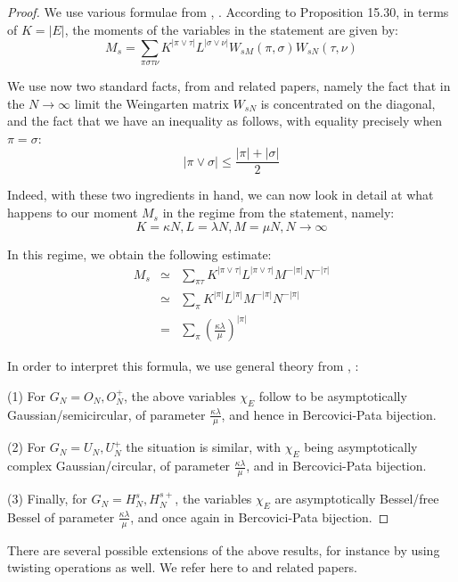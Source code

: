 \documentclass[12pt]{amsbook}
\begin{document}
\begin{proof}
We use various formulae from \cite{bbc}, \cite{bsp}. According to Proposition 15.30, in terms of $K=|E|$, the moments of the variables in the statement are given by:
$$M_s=\sum_{\pi\sigma\tau\nu}K^{|\pi\vee\tau|}L^{|\sigma\vee\nu|}W_{sM}(\pi,\sigma)W_{sN}(\tau,\nu)$$

We use now two standard facts, from \cite{bbc} and related papers, namely the fact that in the $N\to\infty$ limit the Weingarten matrix $W_{sN}$ is concentrated on the diagonal, and the fact that we have an inequality as follows, with equality precisely when $\pi=\sigma$:
$$|\pi\vee\sigma|\leq\frac{|\pi|+|\sigma|}{2}$$

Indeed, with these two ingredients in hand, we can now look in detail at what happens to our moment $M_s$ in the regime from the statement, namely:
$$K=\kappa N,L=\lambda N,M=\mu N,N\to\infty$$

In this regime, we obtain the following estimate:
\begin{eqnarray*}
M_s
&\simeq&\sum_{\pi\tau}K^{|\pi\vee\tau|}L^{|\pi\vee\tau|}M^{-|\pi|}N^{-|\tau|}\\
&\simeq&\sum_\pi K^{|\pi|}L^{|\pi|}M^{-|\pi|}N^{-|\pi|}\\
&=&\sum_\pi\left(\frac{\kappa\lambda}{\mu}\right)^{|\pi|}
\end{eqnarray*}

In order to interpret this formula, we use general theory from \cite{bbc}, \cite{bsp}:

\medskip

(1) For $G_N=O_N,O_N^+$, the above variables $\chi_E$ follow to be asymptotically Gaussian/semicircular, of parameter $\frac{\kappa\lambda}{\mu}$, and hence in Bercovici-Pata bijection.

\medskip

(2) For $G_N=U_N,U_N^+$ the situation is similar, with $\chi_E$ being asymptotically complex Gaussian/circular, of parameter $\frac{\kappa\lambda}{\mu}$, and in Bercovici-Pata bijection. 

\medskip

(3) Finally, for $G_N=H_N^s,H_N^{s+}$, the variables $\chi_E$ are asymptotically Bessel/free Bessel of parameter $\frac{\kappa\lambda}{\mu}$, and once again in Bercovici-Pata bijection.  
\end{proof}

There are several possible extensions of the above results, for instance by using twisting operations as well. We refer here to \cite{bgo} and related papers.
\end{document}
